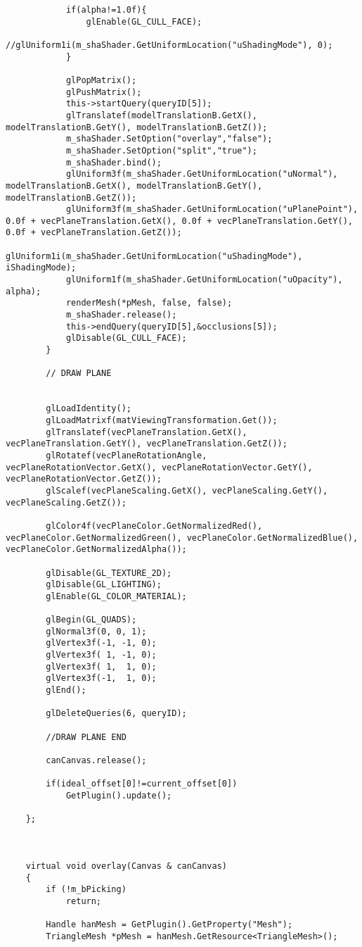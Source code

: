 \begin{verbatim}
			if(alpha!=1.0f){
				glEnable(GL_CULL_FACE);	
				//glUniform1i(m_shaShader.GetUniformLocation("uShadingMode"), 0);
			}

			glPopMatrix();
			glPushMatrix();
			this->startQuery(queryID[5]);
			glTranslatef(modelTranslationB.GetX(), modelTranslationB.GetY(), modelTranslationB.GetZ());
			m_shaShader.SetOption("overlay","false");
			m_shaShader.SetOption("split","true");
			m_shaShader.bind();
			glUniform3f(m_shaShader.GetUniformLocation("uNormal"), modelTranslationB.GetX(), modelTranslationB.GetY(), modelTranslationB.GetZ());
			glUniform3f(m_shaShader.GetUniformLocation("uPlanePoint"), 0.0f + vecPlaneTranslation.GetX(), 0.0f + vecPlaneTranslation.GetY(), 0.0f + vecPlaneTranslation.GetZ());
			glUniform1i(m_shaShader.GetUniformLocation("uShadingMode"), iShadingMode);
			glUniform1f(m_shaShader.GetUniformLocation("uOpacity"), alpha);
			renderMesh(*pMesh, false, false);
			m_shaShader.release();
			this->endQuery(queryID[5],&occlusions[5]);
			glDisable(GL_CULL_FACE);
		}

		// DRAW PLANE


		glLoadIdentity();
		glLoadMatrixf(matViewingTransformation.Get());
		glTranslatef(vecPlaneTranslation.GetX(), vecPlaneTranslation.GetY(), vecPlaneTranslation.GetZ());
		glRotatef(vecPlaneRotationAngle, vecPlaneRotationVector.GetX(), vecPlaneRotationVector.GetY(), vecPlaneRotationVector.GetZ());
		glScalef(vecPlaneScaling.GetX(), vecPlaneScaling.GetY(), vecPlaneScaling.GetZ());

		glColor4f(vecPlaneColor.GetNormalizedRed(), vecPlaneColor.GetNormalizedGreen(), vecPlaneColor.GetNormalizedBlue(), vecPlaneColor.GetNormalizedAlpha());

		glDisable(GL_TEXTURE_2D);
		glDisable(GL_LIGHTING);
		glEnable(GL_COLOR_MATERIAL);

		glBegin(GL_QUADS);
		glNormal3f(0, 0, 1);
		glVertex3f(-1, -1, 0);
		glVertex3f( 1, -1, 0);
		glVertex3f( 1,  1, 0);
		glVertex3f(-1,  1, 0);
		glEnd();

		glDeleteQueries(6, queryID);

		//DRAW PLANE END

		canCanvas.release();

		if(ideal_offset[0]!=current_offset[0])
			GetPlugin().update();

	};



	virtual void overlay(Canvas & canCanvas)
	{
		if (!m_bPicking)
			return;

		Handle hanMesh = GetPlugin().GetProperty("Mesh");
		TriangleMesh *pMesh = hanMesh.GetResource<TriangleMesh>();


\end{verbatim}
